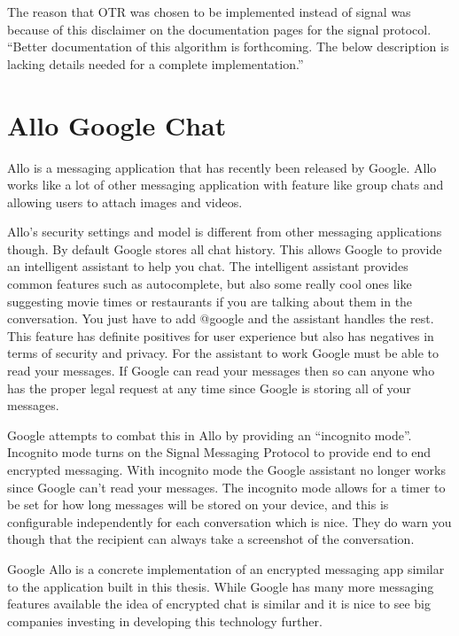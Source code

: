 The reason that OTR was chosen to be implemented instead of signal was because of this disclaimer on the documentation pages for the signal protocol. “Better documentation of this algorithm is forthcoming. The below description is lacking details needed for a complete implementation.”\cite{whisper-protocol}


\section{Allo Google Chat}


Allo is a messaging application that has recently been released by Google. Allo works like a lot of other messaging application with feature like group chats and allowing users to attach images and videos. 


Allo’s security settings and model is different from other messaging applications though. By default Google stores all chat history. This allows Google to provide an intelligent assistant to help you chat. The intelligent assistant provides common features such as autocomplete, but also some really cool ones like suggesting movie times or restaurants if you are talking about them in the conversation. You just have to add @google and the assistant handles the rest. This feature has definite positives for user experience but also has negatives in terms of security and privacy. For the assistant to work Google must be able to read your messages. If Google can read your messages then so can anyone who has the proper legal request at any time since Google is storing all of your messages.


Google attempts to combat this in Allo by providing an “incognito mode”. Incognito mode turns on  the Signal Messaging Protocol to provide end to end encrypted messaging.\cite{whisper-allo} With incognito mode the Google assistant no longer works since Google can’t read your messages. The incognito mode allows for a timer to be set for how long messages will be stored on your device, and this is configurable independently for each conversation which is nice. They do warn you though that the recipient can always take a screenshot of the conversation.


Google Allo is a concrete implementation of an encrypted messaging app similar to the application built in this thesis. While Google has many more messaging features available the idea of encrypted chat is similar and it is nice to see big companies investing in developing this technology further.\cite{google-allo}


